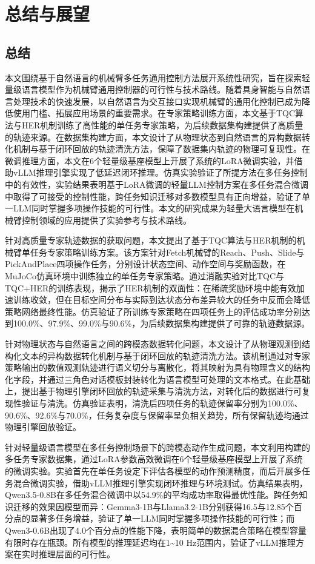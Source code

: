 \chapter{总结与展望}\label{chap:conclusion}

\section{总结}\label{sec:conclusion-summary}

本文围绕基于自然语言的机械臂多任务通用控制方法展开系统性研究，旨在探索轻量级语言模型作为机械臂通用控制器的可行性与技术路线。随着具身智能与自然语言处理技术的快速发展，以自然语言为交互接口实现机械臂的通用化控制已成为降低使用门槛、拓展应用场景的重要需求。在专家策略训练方面，本文基于TQC算法与HER机制训练了高性能的单任务专家策略，为后续数据集构建提供了高质量的轨迹来源。在数据集构建方面，本文设计了从物理状态到自然语言的异构数据转化机制与基于闭环回放的轨迹清洗方法，保障了数据集内轨迹的物理可复现性。在微调推理方面，本文在6个轻量级基座模型上开展了系统的LoRA微调实验，并借助vLLM推理引擎实现了低延迟闭环推理。仿真实验验证了所提方法在多任务控制中的有效性，实验结果表明基于LoRA微调的轻量LLM控制方案在多任务混合微调中取得了可接受的控制性能，跨任务知识迁移对多数模型具有正向增益，验证了单一LLM同时掌握多项操作技能的可行性。本文的研究成果为轻量大语言模型在机械臂控制领域的应用提供了实验参考与技术路线。

针对高质量专家轨迹数据的获取问题，本文提出了基于TQC算法与HER机制的机械臂单任务专家策略训练方案。该方案针对Fetch机械臂的Reach、Push、Slide与PickAndPlace四项操作任务，分别设计状态空间、动作空间与奖励函数，在MuJoCo仿真环境中训练独立的单任务专家策略。通过消融实验对比TQC与TQC+HER的训练表现，揭示了HER机制的双面性：在稀疏奖励环境中能有效加速训练收敛，但在目标空间分布与实际到达状态分布差异较大的任务中反而会降低策略网络最终性能。仿真验证了所训练专家策略在四项任务上的评估成功率分别达到100.0\%、97.9\%、99.0\%与90.6\%，为后续数据集构建提供了可靠的轨迹数据源。

针对物理状态与自然语言之间的跨模态数据转化问题，本文设计了从物理观测到结构化文本的异构数据转化机制与基于闭环回放的轨迹清洗方法。该机制通过对专家策略输出的数值观测轨迹进行语义切分与离散化，将其映射为具有物理含义的结构化字段，并通过三角色对话模板封装转化为语言模型可处理的文本格式。在此基础上，提出基于物理引擎闭环回放的轨迹采集与清洗方法，对转化后的数据进行可复现性验证与清洗。仿真验证表明，清洗后四项任务的轨迹保留率分别为100.0\%、90.6\%、92.6\%与70.0\%，任务复杂度与保留率呈负相关趋势，所有保留轨迹均通过物理引擎回放验证。

针对轻量级语言模型在多任务控制场景下的跨模态动作生成问题，本文利用构建的多任务专家数据集，通过LoRA参数高效微调在6个轻量级基座模型上开展了系统的微调实验。实验首先在单任务设定下评估各模型的动作预测精度，而后开展多任务混合微调实验，借助vLLM推理引擎实现闭环推理与环境测试。仿真结果表明，Qwen3.5-0.8B在多任务混合微调中以54.9\%的平均成功率取得最优性能。跨任务知识迁移的效果因模型而异：Gemma3-1B与Llama3.2-1B分别获得16.5与12.85个百分点的显著多任务增益，验证了单一LLM同时掌握多项操作技能的可行性；而Qwen3-0.6B出现了4.0个百分点的性能下降，表明简单的数据混合策略在模型容量有限时存在瓶颈。所有模型的推理延迟均在1\textasciitilde10 Hz范围内，验证了vLLM推理方案在实时推理层面的可行性。

